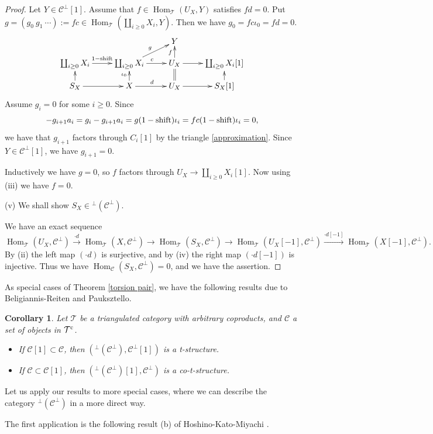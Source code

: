 \documentclass[a4paper,reqno]{amsart}
\newtheorem{corollary}[theorem]{Corollary}
\theoremstyle{definition}
\newcommand{\CC}{{\mathcal C}}
\newcommand{\TT}{{\mathcal T}}
\newcommand{\Hom}{\operatorname{Hom}\nolimits}
\begin{document}
\begin{proof}
Let $Y\in\CC^\perp[1]$. Assume that $f\in\Hom_{\TT}(U_X,Y)$ satisfies $fd=0$.
Put $g=(g_0\ g_1\ \cdots):=fc\in\Hom_{\TT}(\coprod_{i\ge0}X_i,Y)$.
Then we have $g_0=fc\iota_0=fd=0$.
\[\xymatrix@R=.4cm{
&&Y\\
\coprod_{i\ge0}X_i\ar[r]^{1-{\rm shift}}&\coprod_{i\ge0}X_i\ar[r]^{c}\ar[ur]^g&U_X\ar[r]\ar[u]^f&\coprod_{i\ge0}X_i[1]\\
S_X\ar[r]\ar[u]&X\ar[r]^d\ar[u]^{\iota_0}&U_X\ar[r]\ar@{=}[u]&S_X[1]\ar[u]
}\]
Assume $g_i=0$ for some $i\ge0$. Since
\[-g_{i+1}a_i=g_i-g_{i+1}a_i=g(1-{\rm shift})\iota_i=fc(1-{\rm shift})\iota_i=0,\]
we have that $g_{i+1}$ factors through $C_i[1]$ by the triangle \eqref{approximation}.
Since $Y\in\CC^\perp[1]$, we have $g_{i+1}=0$.

Inductively we have $g=0$, so $f$ factors through $U_X\to\coprod_{i\ge0}X_i[1]$.
Now using (iii) we have $f=0$.

(v) We shall show $S_X\in{}^\perp(\CC^\perp)$.

We have an exact sequence
\[\Hom_{\TT}(U_X,\CC^\perp)\xrightarrow{\cdot d}\Hom_{\TT}(X,\CC^\perp)\xrightarrow{}\Hom_{\TT}(S_X,\CC^\perp)\xrightarrow{}
\Hom_{\TT}(U_X[-1],\CC^\perp)\xrightarrow{\cdot d[-1]}\Hom_{\TT}(X[-1],\CC^\perp).\]
By (ii) the left map $(\cdot d)$ is surjective, and
by (iv) the right map $(\cdot d[-1])$ is injective.
Thus we have $\Hom_{\CC}(S_X,\CC^\perp)=0$, and we have the assertion.
\end{proof}

As special cases of Theorem \ref{torsion pair}, we have the following results due to Beligiannis-Reiten and Pauksztello.

\begin{corollary}\label{t and co-t}
Let $\TT$ be a triangulated category with arbitrary coproducts,
and $\CC$ a set of objects in $\TT^{\rm c}$.
\begin{itemize}
\item[(a)] \cite{BR} If $\CC[1]\subset\CC$, then $({}^\perp(\CC^\perp),\CC^\perp [1])$ is a t-structure.
\item[(b)] \cite{P2} If $\CC\subset\CC[1]$, then $({}^\perp(\CC^\perp)[1],\CC^\perp)$ is a co-t-structure.
\end{itemize}
\end{corollary}

Let us apply our results to more special cases, where we can describe the category ${}^\perp(\CC^\perp)$ in a more direct way.

The first application is the following result (b) of Hoshino-Kato-Miyachi \cite{HKM}.
\end{document}
